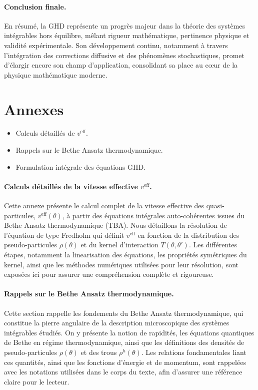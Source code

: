 \paragraph{Conclusion finale.}
En résumé, la GHD représente un progrès majeur dans la théorie des systèmes intégrables hors équilibre, mêlant rigueur mathématique, pertinence physique et validité expérimentale. Son développement continu, notamment à travers l’intégration des corrections diffusive et des phénomènes stochastiques, promet d’élargir encore son champ d’application, consolidant sa place au cœur de la physique mathématique moderne.


\section*{Annexes}
{\color{blue}
\begin{itemize}
    \item Calculs détaillés de $v^{\mathrm{eff}}$.
    \item Rappels sur le Bethe Ansatz thermodynamique.
    \item Formulation intégrale des équations GHD.
\end{itemize}
}


\paragraph{Calculs détaillés de la vitesse effective $v^{\mathrm{eff}}$.}
Cette annexe présente le calcul complet de la vitesse effective des quasi-particules, $v^{\mathrm{eff}}(\theta)$, à partir des équations intégrales auto-cohérentes issues du Bethe Ansatz thermodynamique (TBA). Nous détaillons la résolution de l’équation de type Fredholm qui définit $v^{\mathrm{eff}}$ en fonction de la distribution des pseudo-particules $\rho(\theta)$ et du kernel d’interaction $T(\theta,\theta')$. Les différentes étapes, notamment la linearisation des équations, les propriétés symétriques du kernel, ainsi que les méthodes numériques utilisées pour leur résolution, sont exposées ici pour assurer une compréhension complète et rigoureuse.

\paragraph{Rappels sur le Bethe Ansatz thermodynamique.}
Cette section rappelle les fondements du Bethe Ansatz thermodynamique, qui constitue la pierre angulaire de la description microscopique des systèmes intégrables étudiés. On y présente la notion de rapidités, les équations quantiques de Bethe en régime thermodynamique, ainsi que les définitions des densités de pseudo-particules $\rho(\theta)$ et des trous $\rho^h(\theta)$. Les relations fondamentales liant ces quantités, ainsi que les fonctions d’énergie et de momentum, sont rappelées avec les notations utilisées dans le corps du texte, afin d’assurer une référence claire pour le lecteur.

